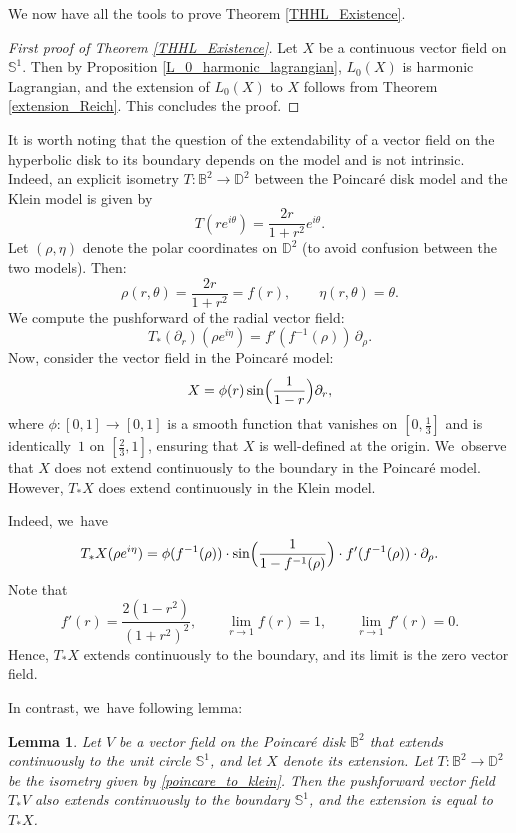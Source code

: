 \documentclass[JEP,XML,SOM,Unicode,NoEqCountersInSection, NoFloatCountersInSection,published]{cedram}
\theoremstyle{plain}
\newtheorem{lemma}[cor]{Lemma}
\theoremstyle{definition}
\begin{document}
We now have all the tools to prove Theorem \ref{THHL_Existence}.
\begin{proof}[First proof of Theorem \ref{THHL_Existence}]
Let $X$ be a continuous vector field on $\mathbb{S}^1$. Then by Proposition \ref{L_0_harmonic_lagrangian}, $L_0(X)$ is harmonic Lagrangian, and the extension of $L_0(X)$ to $X$ follows from Theorem \ref{extension_Reich}. This concludes the proof.
\end{proof}
It is worth noting that the question of the extendability of a vector field on the hyperbolic disk to its boundary depends on the model and is not intrinsic. Indeed, an explicit isometry $T:\mathbb{B}^2 \to \mathbb{D}^2$ between the Poincaré disk model and the Klein model is given by
\begin{equation}\label{poincare_to_klein}
T(re^{i\theta}) = \frac{2r}{1 + r^2} e^{i\theta}.
\end{equation}
Let \((\rho, \eta)\) denote the polar coordinates on \(\mathbb{D}^2\) (to avoid confusion between the two models). Then:
\[
\rho(r, \theta) = \frac{2r}{1 + r^2} = f(r), \qquad \eta(r, \theta) = \theta.
\]
We compute the pushforward of the radial vector field:
\[
T_*(\partial_r)(\rho e^{i\eta}) = f'(f^{-1}(\rho))\, \partial_\rho.
\]
Now, consider the vector field in the Poincaré model:
\[
X = \phi(r) \sin\Bigl(\frac{1}{1 - r}\Bigr) \partial_r,
\]
where \(\phi : [0, 1] \to [0, 1]\) is a smooth function that vanishes on \([0, \tfrac{1}{3}]\) and is identically~\(1\) on \([\tfrac{2}{3}, 1]\), ensuring that \(X\) is well-defined at the origin. We~observe that \(X\) does not extend continuously to the boundary in the Poincaré model. However, \(T_*X\) does extend continuously in the Klein model.

Indeed, we~have
\[
T_*X(\rho e^{i\eta}) = \phi(f^{-1}(\rho)) \cdot \sin\Bigl(\frac{1}{1 - f^{-1}(\rho)}\Bigr) \cdot f'(f^{-1}(\rho)) \cdot \partial_\rho.
\]
Note that
\[
f'(r) = \frac{2(1 - r^2)}{(1 + r^2)^2}, \qquad
\lim_{r \to 1} f(r) = 1, \qquad \lim_{r \to 1} f'(r) = 0.
\]
Hence, \(T_*X\) extends continuously to the boundary, and its limit is the zero vector field.

In contrast, we~have following lemma:

\begin{lemma}\label{extension_B_to_D}
Let \(V\) be a vector field on the Poincaré disk \(\mathbb{B}^2\) that extends continuously to the unit circle \(\mathbb{S}^1\), and let \(X\) denote its extension. Let \(T:\mathbb{B}^2 \to \mathbb{D}^2\) be the isometry given by \eqref{poincare_to_klein}. Then the pushforward vector field \(T_*V\) also extends continuously to the boundary \(\mathbb{S}^1\), and the extension is equal to \(T_*X\).
\end{lemma}
\end{document}
